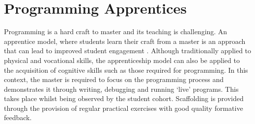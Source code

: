 \documentclass[conference,compsoc]{IEEEtran}
\begin{document}
\section{Programming Apprentices}
Programming is a hard craft to master and its teaching is challenging. An apprentice model, where students learn their craft from a master is an approach that can lead to improved student engagement \cite{Astrachan,Viha}. Although traditionally applied to physical and vocational skills, the apprenticeship model can also be applied to the acquisition of cognitive skills such as those required for programming. In this context, the master is required to focus on the programming process and demonstrates it through writing, debugging and running `live' programs. This takes place whilst being observed by the student cohort. Scaffolding is provided through the provision of regular practical exercises with good quality formative feedback.
\end{document}
